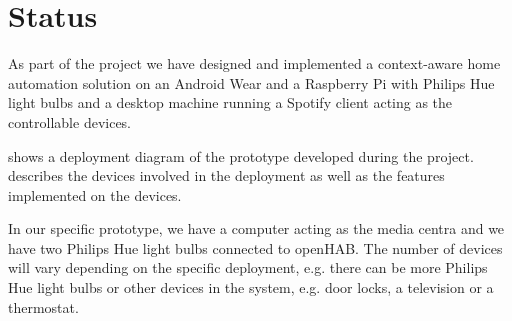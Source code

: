 \section{Status}
\label{sec:implementation:status}

As part of the project we have designed and implemented a context-aware home automation solution on an Android Wear and a Raspberry Pi with Philips Hue light bulbs and a desktop machine running a Spotify client acting as the controllable devices. 

 shows a deployment diagram of the prototype developed during the project.  describes the devices involved in the deployment as well as the features implemented on the devices.

In our specific prototype, we have a computer acting as the media centra and we have two Philips Hue light bulbs connected to openHAB. The number of devices will vary depending on the specific deployment, e.g. there can be more Philips Hue light bulbs or other devices in the system, e.g. door locks, a television or a thermostat.

